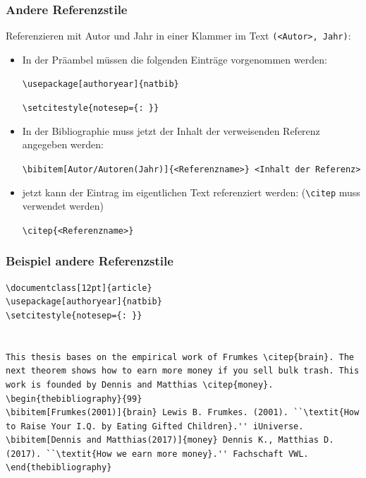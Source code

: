 \begin{frame}[fragile,t]
\frametitle{Andere Referenzstile}
Referenzieren mit Autor und Jahr in einer Klammer im Text \texttt{(<Autor>, Jahr)}:
\begin{itemize}[<+->] 
  \item In der Präambel müssen die folgenden Einträge vorgenommen werden:
   \begin{center}\lstinline[style=Latex]+\usepackage[authoryear]{natbib}+\end{center}
   \begin{center}\lstinline[style=Latex]+\setcitestyle{notesep={: }}+\end{center}
  \item In der Bibliographie muss jetzt der Inhalt der verweisenden Referenz angegeben werden: 
   \begin{center}\lstinline[style=Latex]+\bibitem[Autor/Autoren(Jahr)]{<Referenzname>} <Inhalt der Referenz>+\end{center}
   \item jetzt kann der Eintrag im eigentlichen Text referenziert werden: (\lstinline[style=Latex]+\citep+ muss verwendet werden)
    \begin{center}\lstinline[style=Latex]+\citep{<Referenzname>}+\end{center}
\end{itemize}
\end{frame}


\begin{frame}[fragile,t]
\frametitle{Beispiel andere Referenzstile}\vspace{-10pt}
\begin{lstlisting}[style=Latex]
\documentclass[12pt]{article}
\usepackage[authoryear]{natbib}
\setcitestyle{notesep={: }}


This thesis bases on the empirical work of Frumkes \citep{brain}. The next theorem shows how to earn more money if you sell bulk trash. This work is founded by Dennis and Matthias \citep{money}.
\begin{thebibliography}{99}
\bibitem[Frumkes(2001)]{brain} Lewis B. Frumkes. (2001). ``\textit{How to Raise Your I.Q. by Eating Gifted Children}.'' iUniverse.
\bibitem[Dennis and Matthias(2017)]{money} Dennis K., Matthias D. (2017). ``\textit{How we earn more money}.'' Fachschaft VWL.
\end{thebibliography}

\end{lstlisting}
\end{frame}

